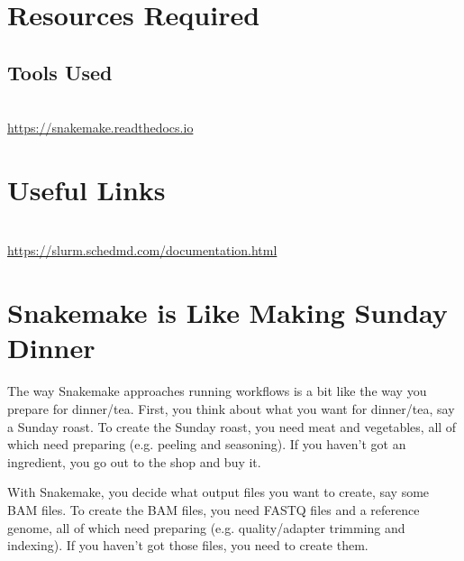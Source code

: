 \section{Resources Required}

\subsection{Tools Used}
\begin{description}[style=multiline,labelindent=0cm,align=left,leftmargin=0.5cm]
  \item[Snakemake]\hfill\\
    \url{https://snakemake.readthedocs.io}
\end{description}

\section{Useful Links}
 
\begin{description}[style=multiline,labelindent=0cm,align=left,leftmargin=0.5cm]
  \item[Slurm Documentation]\hfill\\
    \url{https://slurm.schedmd.com/documentation.html}
\end{description}

\newpage

\section{Snakemake is Like Making Sunday Dinner}

The way Snakemake approaches running workflows is a bit like the way you prepare for dinner/tea.
First, you think about what you want for dinner/tea, say a Sunday roast.
To create the Sunday roast, you need meat and vegetables, all of which need preparing (e.g. peeling and seasoning).
If you haven't got an ingredient, you go out to the shop and buy it.

With Snakemake, you decide what output files you want to create, say some BAM files.
To create the BAM files, you need FASTQ files and a reference genome, all of which need preparing (e.g. quality/adapter trimming and indexing).
If you haven't got those files, you need to create them.

